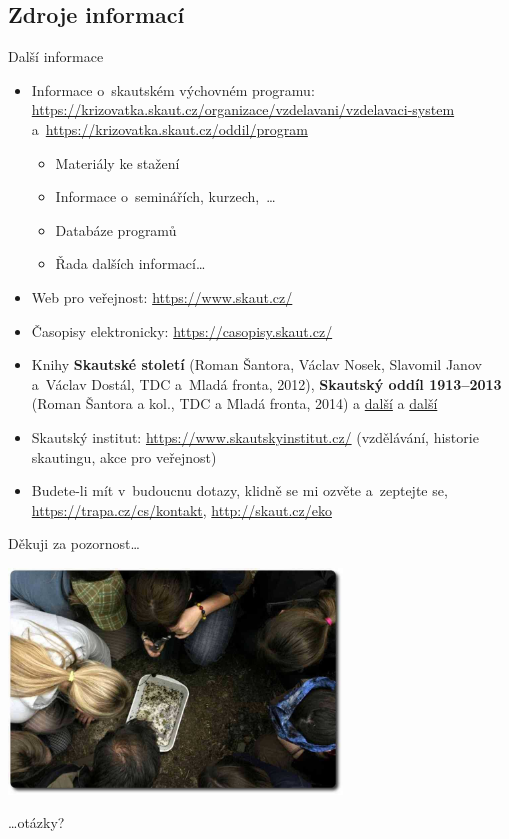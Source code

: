 \documentclass[compress, ucs, xelatex, xcolor=dvipsnames, print,
  hyperref={
    bookmarks=true,
    unicode=true,
    colorlinks=true,
    plainpages=false,
    pdfkeywords={Junak, Pedagogika, Skaut, Skauting, Vychovna metoda},
    linkcolor=Black,
    anchorcolor=Black,
    citecolor=OliveGreen,
    filecolor=OliveGreen,
    menucolor=Black,
    urlcolor=OliveGreen,
    pdftex}
  ]{beamer}
\begin{document}
\subsection{Zdroje informací}

\begin{frame}[allowframebreaks]{Další informace}
  \begin{itemize}
    \item Informace o~skautském výchovném programu: \url{https://krizovatka.skaut.cz/organizace/vzdelavani/vzdelavaci-system} a~\url{https://krizovatka.skaut.cz/oddil/program}
    \begin{itemize}
      \item Materiály ke stažení
      \item Informace o~seminářích, kurzech,~\ldots
      \item Databáze programů
      \item Řada dalších informací\ldots
    \end{itemize}
    \item Web pro veřejnost: \url{https://www.skaut.cz/}
    \item Časopisy elektronicky: \url{https://casopisy.skaut.cz/}
    \item Knihy \textbf{Skautské století} (Roman Šantora, Václav Nosek, Slavomil Janov a~Václav Dostál, TDC a~Mladá fronta, 2012), \textbf{Skautský oddíl 1913--2013} (Roman Šantora a kol., TDC a Mladá fronta, 2014) a \href{https://www.obchod.skaut.cz/publikace/}{další} a \href{https://www.junshop.cz/Tiskoviny-a-DVD/}{další}
    \item Skautský institut: \url{https://www.skautskyinstitut.cz/} (vzdělávání, historie skautingu, akce pro veřejnost)
    \item Budete-li mít v~budoucnu dotazy, klidně se mi ozvěte a~zeptejte se, \url{https://trapa.cz/cs/kontakt}, \href{https://krizovatka.skaut.cz/organizace/ustredi/odbory/ekoodbor}{http://skaut.cz/eko}
  \end{itemize}
\end{frame}

\begin{frame}{Děkuji za pozornost\ldots}
  \begin{center}
    \includegraphics[height=6cm]{zaver.jpg}
  \end{center}
  \begin{flushright}
    \begin{large}
      \ldots otázky?
    \end{large}
  \end{flushright}
\end{frame}
\end{document}
